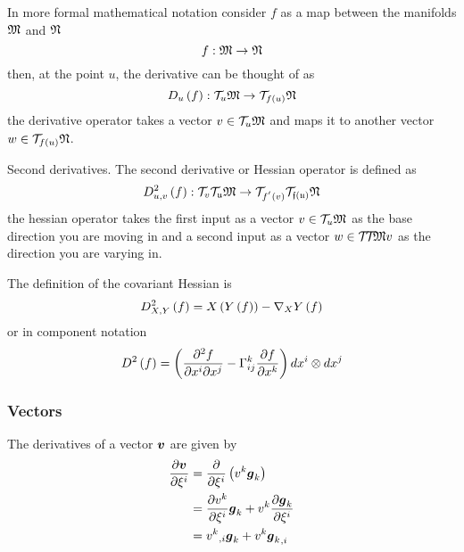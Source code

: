 In more formal mathematical notation consider $f$ as a map between the
manifolds $\manifold{M}$ and $\manifold{N}$ \ie
\begin{equation}
  \mapping{f}{\manifold{M}}{\manifold{N}}
\end{equation}
then, at the point $u$, the derivative can be thought of as 
\begin{equation}
  \mapping{\derivativeop{u}{f}}{\tangentspace{M}{u}}{\tangentspace{N}{\fnof{f}{u}}}
\end{equation}
\ie the derivative operator takes a vector $v\in\tangentspace{M}{u}$ and maps
it to another vector $w\in\tangentspace{N}{\fnof{f}{u}}$.

Second derivatives. The second derivative or Hessian operator is defined as
\begin{equation}
  \mapping{\hessianop{u,v}{f}}{\tangentspace{\tangentspace{M}{u}}{v}}{\tangentspace{\tangentspace{N}{\fnof{f}{u}}}{\fnof{f^{'}}{v}}}
\end{equation}
\ie the hessian operator takes the first input as a vector
$v\in\tangentspace{M}{u}$ as the base direction you are moving in and a
second input as a vector $w\in\tangentspace{\tangentspace{M}}{}{v}$ as the direction
you are varying in.

The definition of the covariant Hessian is
\begin{equation}
  \hessianop{X,Y}{f} = \funccomposition{X}{\funccomposition{Y}{f}}-\funccomposition{\connection{X}{Y}}{f}
\end{equation}
or in component notation
\begin{equation}
  \hessianop{}{f}=\pbrac{\deltwoby{f}{x^{i}}{x^{j}}-\christoffel{k}{i}{j}\delby{f}{x^{k}}}\tensorprod{dx^{i}}{dx^{j}}
\end{equation}



\subsubsection{Vectors}

The derivatives of a vector $\vectr{v}$ are given by
\begin{equation}
  \begin{split}
    \delby{\vectr{v}}{\xi^{i}} &=
    \delby{}{\xi^{i}}\pbrac{v^{k}\vectr{g}_{k}} \\
    &= \delby{v^{k}}{\xi^{i}}\vectr{g}_{k}+v^{k}\delby{\vectr{g}_{k}}{\xi^{i}} \\
    &= \partialderiv{v^{k}}{i}\vectr{g}_{k}+v^{k}\partialderiv{\vectr{g}_{k}}{i}
  \end{split}
\end{equation}

